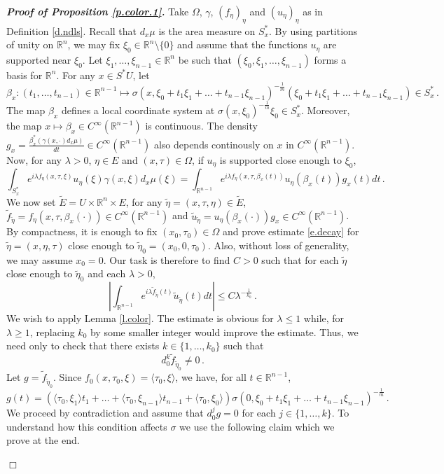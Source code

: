 \documentclass[10pt,twoside]{article}
\newcommand{\R}{\mathbb{R}}
\newenvironment{prf}[1][]
{\vskip 2mm  {\it \bf Proof#1. }}{$\Box$ \vskip 2mm}
\numberwithin{theorem}{section}
\begin{document}
\begin{prf}[ of Proposition \ref{p.color.1}]
Take $\Omega$, $\gamma$, $(f_\eta)_\eta$ and $(u_\eta)_\eta$ as in Definition \ref{d.ndls}. Recall that $d_x\mu$ is the area measure on $S^*_x$. By using partitions of unity on $\R^n$, we may fix  $\xi_0\in\R^n\setminus\{0\}$ and assume that the functions $u_\eta$ are supported near $\xi_0$. Let $\xi_1,\dots,\xi_{n-1}\in\R^n$ be such that $(\xi_0,\xi_1,\dots,\xi_{n-1})$ forms a basis for $\R^n$. For any $x\in S^*U$, let
\[
\beta_x:(t_1,\dots,t_{n-1})\in\R^{n-1}\mapsto \sigma(x,\xi_0+t_1\xi_1+\dots+t_{n-1}\xi_{n-1})^{-\frac{1}{m}}(\xi_0+t_1\xi_1+\dots+t_{n-1}\xi_{n-1})\in S^*_x\, .
\]
The map $\beta_x$ defines a local coordinate system at $\sigma(x,\xi_0)^{-\frac{1}{m}}\xi_0\in S^*_x$. Moreover, the map $x\mapsto \beta_x\in C^\infty(\R^{n-1})$ is continuous. The density $g_x=\frac{\beta_x^*(\gamma(x,\cdot)d_x\mu)}{dt}\in C^\infty(\R^{n-1})$ also depends continously on $x$ in $C^\infty(\R^{n-1})$. Now, for any $\lambda>0$, $\eta\in E$ and $(x,\tau)\in \Omega$, if $u_\eta$ is supported close enough to $\xi_0$,
\[
\int_{S^*_x}e^{i\lambda f_\eta(x,\tau,\xi)}u_\eta(\xi)\gamma(x,\xi)d_x\mu(\xi)=\int_{\R^{n-1}} e^{i\lambda f_\eta(x,\tau,\beta_x(t))}u_\eta(\beta_x(t))g_x(t)dt\, .
\]
We now set $\tilde{E}=U\times\R^n\times E$, for any $\tilde{\eta}=(x,\tau,\eta)\in\tilde{E}$, $\tilde{f}_{\tilde{\eta}}=f_\eta(x,\tau,\beta_x(\cdot))\in C^\infty(\R^{n-1})$ and $\tilde{u}_{\tilde{\eta}}=u_\eta(\beta_x(\cdot))g_x\in C^\infty(\R^{n-1})$. By compactness, it is enough to fix $(x_0,\tau_0)\in \Omega$ and prove estimate \eqref{e.decay} for $\tilde{\eta}=(x,\eta,\tau)$ close enough to $\tilde{\eta}_0=(x_0,0,\tau_0)$. Also, without loss of generality, we may assume $x_0=0$. Our task is therefore to find $C>0$ such that for each $\tilde{\eta}$ close enough to $\tilde{\eta}_0$ and each $\lambda>0$,
\[
\left|\int_{\R^{n-1}}e^{i\lambda \tilde{f}_{\tilde{\eta}}(t)}\tilde{u}_{\tilde{\eta}}(t)dt\right|\leq C\lambda^{-\frac{1}{k_0}}\, .
\]
We wish to apply Lemma \ref{l.color}. The estimate is obvious for $\lambda \leq 1$ while, for $\lambda \geq 1$, replacing $k_0$ by some smaller integer would improve the estimate. Thus, we need only to check that there exists $k\in\{1,\dots,k_0\}$ such that
\begin{equation}\label{e.color.5}
d^k_0\tilde{f}_{\tilde{\eta}_0}\neq 0\, .
\end{equation}
Let $g=\tilde{f}_{\tilde{\eta}_0}$. Since $f_0(x,\tau_0,\xi)=\langle\tau_0,\xi\rangle$, we have, for all $t\in\R^{n-1}$,
\[
g(t)=(\langle \tau_0,\xi_1\rangle t_1+\dots+\langle \tau_0,\xi_{n-1}\rangle t_{n-1}+\langle\tau_0,\xi_0\rangle)\sigma(0,\xi_0+t_1\xi_1+\dots+t_{n-1}\xi_{n-1})^{-\frac{1}{m}}\, .
\]
We proceed by contradiction and assume that $d^j_0g=0$ for each $j\in\{1,\dots,k\}$. To understand how this condition affects $\sigma$ we use the following claim which we prove at the end.


\end{prf}
\end{document}
